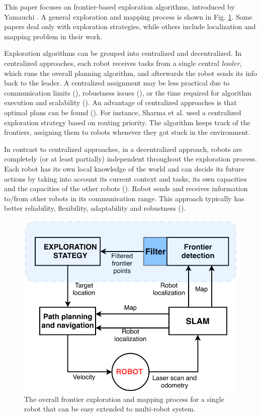 This paper focuses on frontier-based exploration algorithms, introduced by Yamauchi \cite{Yamauchi1997}. A general exploration and mapping process is shown in Fig. \ref{fig:strategy_one_robot}. Some papers deal only with exploration strategies, while others include localization and mapping problem in their work. 

Exploration algorithms can be grouped into centralized and decentralized. In centralized approaches, each robot receives tasks from a single central \emph{leader}, which runs the overall planning algorithm, and afterwards the robot sends its info back to the leader. A centralized assignment may be less practical due to communication limits (\cite{Dias2000}), robustness issues (\cite{Dias2006}), or the time required for algorithm execution and scalability (\cite{Julia2012}). An advantage of centralized approaches is that optimal plans can be found (\cite{Yan2011}). For instance, Sharma et al. \cite{SharmaHonc2016} used a centralized exploration strategy based on routing priority. The algorithm keeps track of the frontiers, assigning them to robots whenever they got stuck in the environment.

In contrast to centralized approaches, in a decentralized approach, robots are completely (or at least partially) independent throughout the exploration process. Each robot has its own local knowledge of the world and can decide its future actions by taking into account its current context and tasks, its own capacities and the capacities of the other robots (\cite{Yan2013}). Robot sends and receives information to/from other robots in its communication range. This approach typically has better reliability, flexibility, adaptability and robustness (\cite{Zlot2002}). 

\begin{figure}[t!]
	\centering
	\includegraphics[width=1.0\columnwidth]{./pictures/strategy_one_robot.pdf}
	\caption {The overall frontier exploration and mapping process for a single robot that can be easy extended to multi-robot system.}
	\label{fig:strategy_one_robot}
\end{figure}
 
